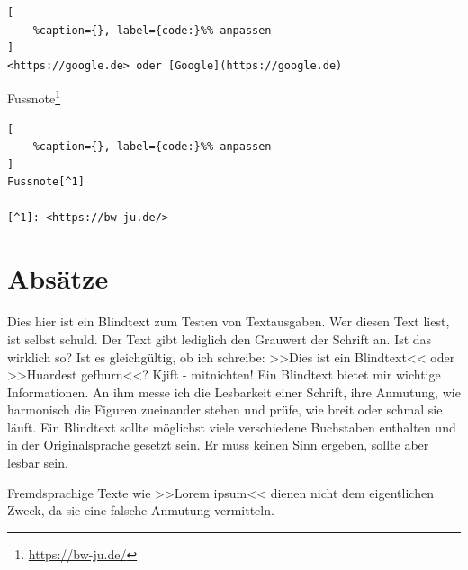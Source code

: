 \lstset{language=C}%
\begin{lstlisting}[
	%caption={}, label={code:}%% anpassen
]
<https://google.de> oder [Google](https://google.de)
\end{lstlisting}

Fussnote\footnote{\url{https://bw-ju.de/}}

\lstset{language=C}%
\begin{lstlisting}[
	%caption={}, label={code:}%% anpassen
]
Fussnote[^1]       

[^1]: <https://bw-ju.de/>
\end{lstlisting}

\section{Absätze}\label{absaetze}

Dies hier ist ein Blindtext zum Testen von Textausgaben. Wer diesen Text
liest, ist selbst schuld. Der Text gibt lediglich den Grauwert der
Schrift an. Ist das wirklich so? Ist es gleichgültig, ob ich schreibe:
>>Dies ist ein Blindtext<< oder >>Huardest gefburn<<? Kjift -
mitnichten! Ein Blindtext bietet mir wichtige Informationen. An ihm
messe ich die Lesbarkeit einer Schrift, ihre Anmutung, wie harmonisch
die Figuren zueinander stehen und prüfe, wie breit oder schmal sie
läuft. Ein Blindtext sollte möglichst viele verschiedene Buchstaben
enthalten und in der Originalsprache gesetzt sein. Er muss keinen Sinn
ergeben, sollte aber lesbar sein.

Fremdsprachige Texte wie >>Lorem ipsum<< dienen nicht dem eigentlichen
Zweck, da sie eine falsche Anmutung vermitteln.
